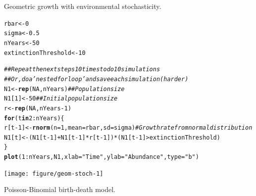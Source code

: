 \documentclass[12pt]{article}\usepackage[]{graphicx}\usepackage[]{xcolor}
\makeatletter
\newcommand{\hlnum}[1]{\textcolor[rgb]{0.686,0.059,0.569}{#1}}%
\newcommand{\hlsng}[1]{\textcolor[rgb]{0.192,0.494,0.8}{#1}}%
\newcommand{\hlcom}[1]{\textcolor[rgb]{0.678,0.584,0.686}{\textit{#1}}}%
\newcommand{\hlopt}[1]{\textcolor[rgb]{0,0,0}{#1}}%
\newcommand{\hldef}[1]{\textcolor[rgb]{0.345,0.345,0.345}{#1}}%
\newcommand{\hlkwa}[1]{\textcolor[rgb]{0.161,0.373,0.58}{\textbf{#1}}}%
\newcommand{\hlkwb}[1]{\textcolor[rgb]{0.69,0.353,0.396}{#1}}%
\newcommand{\hlkwc}[1]{\textcolor[rgb]{0.333,0.667,0.333}{#1}}%
\newcommand{\hlkwd}[1]{\textcolor[rgb]{0.737,0.353,0.396}{\textbf{#1}}}%
\newenvironment{kframe}{%
 \def\at@end@of@kframe{}%
 \ifinner\ifhmode%
  \def\at@end@of@kframe{\end{minipage}}%
  \begin{minipage}{\columnwidth}%
 \fi\fi%
 \def\FrameCommand##1{\hskip\@totalleftmargin \hskip-\fboxsep
 \colorbox{shadecolor}{##1}\hskip-\fboxsep
     \hskip-\linewidth \hskip-\@totalleftmargin \hskip\columnwidth}%
 \MakeFramed {\advance\hsize-\width
   \@totalleftmargin\z@ \linewidth\hsize
   \@setminipage}}%
 {\par\unskip\endMakeFramed%
 \at@end@of@kframe}
\newenvironment{knitrout}{}{} %
\makeatother
\begin{document}
Geometric growth with environmental stochasticity. %

\begin{knitrout}
\color{fgcolor}\begin{kframe}
\begin{alltt}
\hldef{rbar} \hlkwb{<-} \hlnum{0}
\hldef{sigma} \hlkwb{<-} \hlnum{0.5}
\hldef{nYears} \hlkwb{<-} \hlnum{50}
\hldef{extinctionThreshold} \hlkwb{<-} \hlnum{10}

\hlcom{## Repeat the next steps 10 times to do 10 simulations}
\hlcom{## Or, do a 'nested for loop' and save each simulation (harder)}
\hldef{N1} \hlkwb{<-} \hlkwd{rep}\hldef{(}\hlnum{NA}\hldef{, nYears)}  \hlcom{## Population size }
\hldef{N1[}\hlnum{1}\hldef{]} \hlkwb{<-} \hlnum{50}            \hlcom{## Initial population size}
\hldef{r} \hlkwb{<-} \hlkwd{rep}\hldef{(}\hlnum{NA}\hldef{, nYears}\hlopt{-}\hlnum{1}\hldef{)}
\hlkwa{for}\hldef{(t} \hlkwa{in} \hlnum{2}\hlopt{:}\hldef{nYears) \{}
    \hldef{r[t}\hlopt{-}\hlnum{1}\hldef{]} \hlkwb{<-} \hlkwd{rnorm}\hldef{(}\hlkwc{n}\hldef{=}\hlnum{1}\hldef{,} \hlkwc{mean}\hldef{=rbar,} \hlkwc{sd}\hldef{=sigma)} \hlcom{# Growth rate from normal distribution}
    \hldef{N1[t]} \hlkwb{<-} \hldef{(N1[t}\hlopt{-}\hlnum{1}\hldef{]} \hlopt{+} \hldef{N1[t}\hlopt{-}\hlnum{1}\hldef{]}\hlopt{*}\hldef{r[t}\hlopt{-}\hlnum{1}\hldef{])}\hlopt{*}\hldef{(N1[t}\hlopt{-}\hlnum{1}\hldef{]}\hlopt{>}\hldef{extinctionThreshold)}
\hldef{\}}
\hlkwd{plot}\hldef{(}\hlnum{1}\hlopt{:}\hldef{nYears, N1,} \hlkwc{xlab}\hldef{=}\hlsng{"Time"}\hldef{,} \hlkwc{ylab}\hldef{=}\hlsng{"Abundance"}\hldef{,} \hlkwc{type}\hldef{=}\hlsng{"b"}\hldef{)}
\end{alltt}
\end{kframe}

{\centering \texttt{[image: figure/geom-stoch-1]} 

}


\end{knitrout}


\newpage

Poisson-Binomial birth-death model. %
\end{document}
